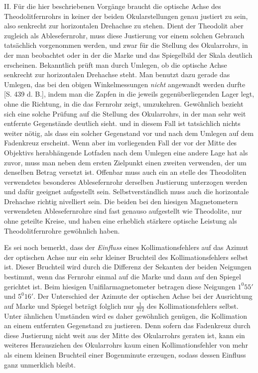 II. Für die hier beschriebenen Vorgänge braucht die optische Achse des Theodolitfernrohrs in keiner der beiden Okularstellungen genau justiert zu sein, also senkrecht zur horizontalen Drehachse zu stehen. Dient der Theodolit aber zugleich als Ablesefernrohr, muss diese Justierung vor einem solchen Gebrauch tatsächlich vorgenommen werden, und zwar für die Stellung des Okularrohrs, in der man beobachtet oder in der die Marke und das Spiegelbild der Skala deutlich erscheinen. Bekanntlich prüft man durch Umlegen, ob die optische Achse senkrecht zur horizontalen Drehachse steht. Man benutzt dazu gerade das Umlegen, das bei den obigen Winkelmessungen \textit{nicht} angewandt werden durfte [S. 439 d. B.], indem man die Zapfen in die jeweils gegenüberliegenden Lager legt, ohne die Richtung, in die das Fernrohr zeigt, umzukehren. Gewöhnlich bezieht sich eine solche Prüfung auf die Stellung des Okularrohrs, in der man sehr weit entfernte Gegenstände deutlich sieht. und in diesem Fall ist tatsächlich nichts weiter nötig, als dass ein solcher Gegenstand vor und nach dem Umlegen auf dem Fadenkreuz erscheint. Wenn aber im vorliegenden Fall der vor der Mitte des Objektivs herabhängende Lotfaden nach dem Umlegen eine andere Lage hat als zuvor, muss man neben dem ersten Zielpunkt einen zweiten verwenden, der um denselben Betrag versetzt ist. Offenbar muss auch ein an%
%
stelle des Theodoliten verwendetes besonderes Ablesefernrohr derselben Justierung unterzogen werden und dafür geeignet aufgestellt sein. Selbstverständlich muss auch die horizontale Drehachse richtig nivelliert sein. Die beiden bei den hiesigen Magnetometern verwendeten Ablesefernrohre sind fast genauso aufgestellt wie Theodolite, nur ohne geteilte Kreise, und haben eine erheblich stärkere optische Leistung als Theodolitfernrohre gewöhnlich haben.

Es sei noch bemerkt, dass der \textit{Einfluss} eines Kollimationsfehlers auf das Azimut der optischen Achse nur ein sehr kleiner Bruchteil des Kollimationsfehlers selbst ist. Dieser Bruchteil wird durch die Differenz der Sekanten der beiden Neigungen bestimmt, wenn das Fernrohr einmal auf die Marke und dann auf den Spiegel gerichtet ist. Beim hiesigen Unifilarmagnetometer betragen diese Neigungen $1^0 55'$ und $5^0 16'$. Der Unterschied der Azimute der optischen Achse bei der Ausrichtung auf Marke und Spiegel beträgt folglich nur $\frac{1}{272}$ des Kollimationsfehlers selbst. Unter ähnlichen Umständen wird es daher gewöhnlich genügen, die Kollimation an einem entfernten Gegenstand zu justieren. Denn sofern das Fadenkreuz durch diese Justierung nicht weit aus der Mitte des Okularrohrs geraten ist, kann ein weiteres Herausziehen des Okularrohrs kaum einen Kollimationsfehler von mehr als einem kleinen Bruchteil einer Bogenminute erzeugen, sodass dessen Einfluss ganz unmerklich bleibt.

